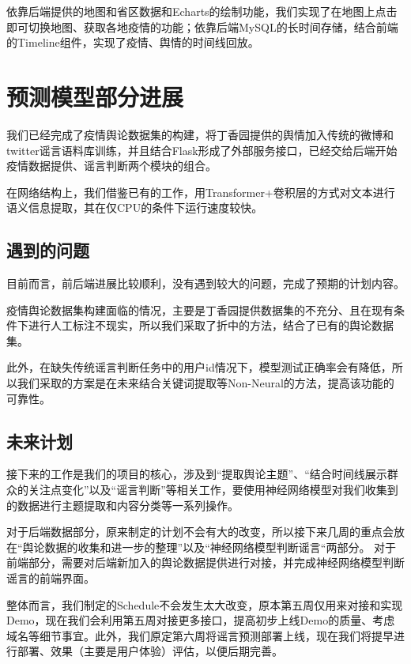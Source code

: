 \documentclass{article}
\begin{document}
依靠后端提供的地图和省区数据和Echarts的绘制功能，我们实现了在地图上点击即可切换地图、获取各地疫情的功能；依靠后端MySQL的长时间存储，结合前端的Timeline组件，实现了疫情、舆情的时间线回放。


\section{预测模型部分进展}
我们已经完成了疫情舆论数据集的构建，将丁香园提供的舆情加入传统的微博和twitter谣言语料库训练，并且结合Flask形成了外部服务接口，已经交给后端开始疫情数据提供、谣言判断两个模块的组合。

在网络结构上，我们借鉴已有的工作，用Transformer+卷积层的方式对文本进行语义信息提取，其在仅CPU的条件下运行速度较快。


\subsection{遇到的问题}
目前而言，前后端进展比较顺利，没有遇到较大的问题，完成了预期的计划内容。

疫情舆论数据集构建面临的情况，主要是丁香园提供数据集的不充分、且在现有条件下进行人工标注不现实，所以我们采取了折中的方法，结合了已有的舆论数据集。

此外，在缺失传统谣言判断任务中的用户id情况下，模型测试正确率会有降低，所以我们采取的方案是在未来结合关键词提取等Non-Neural的方法，提高该功能的可靠性。

\subsection{未来计划}
接下来的工作是我们的项目的核心，涉及到“提取舆论主题”、“结合时间线展示群众的关注点变化”以及“谣言判断”等相关工作，要使用神经网络模型对我们收集到的数据进行主题提取和内容分类等一系列操作。

对于后端数据部分，原来制定的计划不会有大的改变，所以接下来几周的重点会放在“舆论数据的收集和进一步的整理”以及“神经网络模型判断谣言“两部分。
对于前端部分，需要对后端新加入的舆论数据提供进行对接，并完成神经网络模型判断谣言的前端界面。

整体而言，我们制定的Schedule不会发生太大改变，原本第五周仅用来对接和实现Demo，现在我们会利用第五周对接更多接口，提高初步上线Demo的质量、考虑域名等细节事宜。此外，我们原定第六周将谣言预测部署上线，现在我们将提早进行部署、效果（主要是用户体验）评估，以便后期完善。
\end{document}
